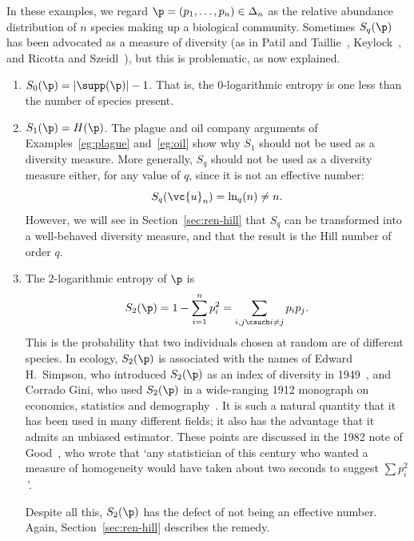 \begin{examples}
In these examples, we regard $\p = (p_1, \ldots, p_n) \in \Delta_n$ as the
relative abundance distribution of $n$ species making up a biological
community.  Sometimes $S_q(\p)$ has been advocated as a measure of
diversity (as in Patil and Taillie~\cite{PaTaDCM}, Keylock~\cite{Keyl}, and
Ricotta and Szeidl~\cite{RiSzTUA}), but this is problematic, as now
explained.  
% 
\begin{enumerate}
\item 
$S_0(\p) = |\supp(\p)| - 1$.  That is, the $0$-logarithmic entropy is one
  less than the number of species present.

\item
$S_1(\p) = H(\p)$.  The plague and oil company arguments of
  Examples~\ref{eg:plague} and~\ref{eg:oil} show why
$S_1$ should not be used as a diversity measure.  More generally, $S_q$
should not be used as a diversity measure either, for any value of $q$,
since it is not an effective number:
\[
S_q(\vc{u}_n) 
= 
\ln_q(n) 
\neq 
n.
\]
However, we will see in Section~\ref{sec:ren-hill} that $S_q$ can be
transformed into a well-behaved diversity measure, and that the result is
the Hill number of order $q$.

\item
{}
The $2$-logarithmic entropy of $\p$ is
\[
S_2(\p)
=
1 - \sum_{i = 1}^n p_i^2
=
\sum_{i, j \csuch i \neq j} p_i p_j.
\]
This is the probability that two individuals chosen at random are of
different species.  In ecology, $S_2(\p)$ is associated with the names of
Edward H.~Simpson,%
%
% 
who introduced $S_2(\p)$ as an index of diversity in 1949~\cite{SimpMD},
and Corrado Gini,%
%
%
who used $S_2(\p)$ in a wide-ranging 1912 monograph on economics,
statistics and demography~\cite{Gini}.  It is such a natural quantity that
it has been used in many different fields; it also has the advantage that
it admits an unbiased estimator.  These points are discussed in the 1982
note of Good~\cite{GoodDCM},%
% 
% 
who wrote that `any statistician of this century who wanted a measure of
homogeneity would have taken about two seconds to suggest $\sum p_i^2$\,'.

Despite all this, $S_2(\p)$ has the defect of not being an effective
number.  Again, Section~\ref{sec:ren-hill} describes the remedy.
\end{enumerate}
\end{examples}


